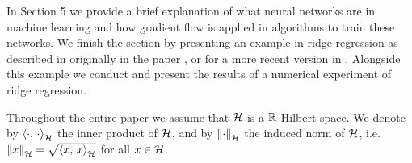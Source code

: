 In Section 5 we provide a brief explanation of what neural networks
are in machine learning and how gradient flow is applied in
algorithms to train these networks. We finish the section by
presenting an example in ridge regression 
as described in originally in the paper \cite{hoerl1970ridge}, 
or for a more recent version in \cite{signoretto2014learning}.
Alongside this example we conduct and present the results
of a numerical experiment of ridge regression.\medskip

Throughout the entire paper we assume that $ \mathcal{H} $ is a $ \mathbb{R} $-Hilbert space. 
We denote by $ \left\langle \cdot,\,\cdot\right\rangle_{\mathcal{H}} $ the inner product of $ \mathcal{H} $, 
and by $ \left\Vert \cdot\right\Vert_{\mathcal{H}} $ the induced norm of $ \mathcal{H} $, i.e. $ \left\Vert x\right\Vert_{\mathcal{H}}=\sqrt{\left\langle x,\,x\right\rangle_{\mathcal{H}}} $
for all $ x\in\mathcal{H} $.